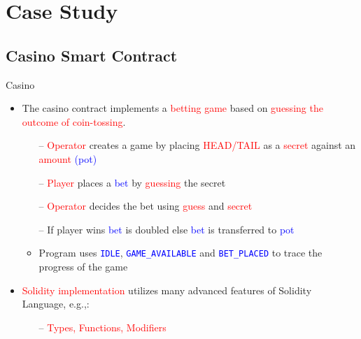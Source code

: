 \documentclass[aspectratio=169]{beamer}
\begin{document}
\section{Case Study}

\subsection{Casino Smart Contract}
%
\begin{frame}{Casino}
\begin{itemize}

\item The casino contract implements a \textcolor{red}{betting game} based on \textcolor{red}{guessing  the outcome of coin-tossing}.
\begin{itemize}
\item[--] \textcolor{red}{Operator} creates a game by placing \textcolor{red}{HEAD/TAIL} as a \textcolor{red}{ secret} against an \textcolor{red}{ amount} \textcolor{blue}{ (pot)}
\item[--] \textcolor{red}{Player} places a \textcolor{blue}{ bet} by \textcolor{red}{guessing} the secret 
\item[--] \textcolor{red}{Operator} decides the bet using \textcolor{red}{guess} and \textcolor{red}{secret}
\item[--] If player wins \textcolor{blue}{ bet} is doubled else \textcolor{blue}{bet} is transferred to \textcolor{blue}{pot}
\item Program uses \texttt{\textcolor{blue}{IDLE}}, \texttt{\textcolor{blue}{GAME\_AVAILABLE}} and \texttt{\textcolor{blue}{BET\_PLACED}} to trace the progress of the game
\end{itemize}
\item \textcolor{red}{Solidity  implementation} utilizes many advanced features of Solidity Language, e.g.,:
\begin{itemize}
\item[--] \textcolor{red}{Types, Functions, Modifiers }
\end{itemize}
\end{itemize}
\end{frame}
\end{document}
